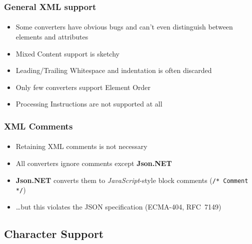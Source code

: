 \documentclass[
    alternativetitlepage=alternativ,
    cornerlogo=hgi_nds_logo2,
    sectionoverview,
]{rubpresentation}
\begin{document}
\begin{frame}
  \frametitle{General XML support}
  \framesubtitle{}
  \begin{itemize}
    \item{} Some converters have obvious bugs and can't even distinguish between elements and attributes
    \item{} Mixed Content support is sketchy
    \item{} Leading/Trailing Whitespace and indentation is often discarded
    \item{} Only few converters support Element Order
    \item{} Processing Instructions are not supported at all
  \end{itemize}
\end{frame}

\begin{frame}
  \frametitle{XML Comments}
  \framesubtitle{}
  \begin{itemize}
    \item{} Retaining XML comments is not necessary
    \item{} All converters ignore comments except \textbf{Json.NET}
    \item{} \textbf{Json.NET} converts them to \emph{JavaScript}-style block comments (\texttt{/* Comment */})
    \item{} \dots{}but this violates the JSON specification (ECMA-404, RFC~7149)
  \end{itemize}
\end{frame}

\subsection{Character Support}

\begingroup
  \begin{frame}[fragile]
    \vspace{-1.15cm}
    \begin{center}
      
    \end{center}
  \end{frame}
\endgroup

\begingroup
  \begin{frame}[fragile]
    \vspace{-1.15cm}
    \begin{center}
      
    \end{center}
  \end{frame}
\endgroup
\end{document}
